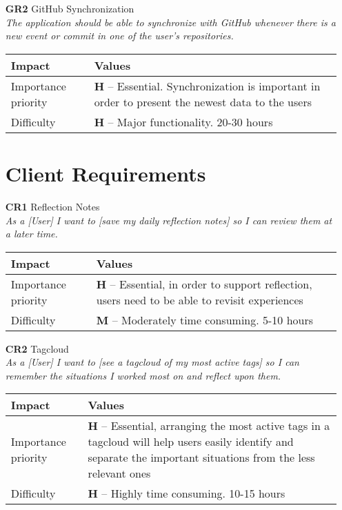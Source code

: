 \begin{itemize}
    \item[\textbf{GR2}] GitHub Synchronization\\
        \textit{\small{The application should be able to synchronize with GitHub whenever there is a new event or commit in one of the user's repositories.}}

        \begin{tabular}{| l | p{7cm} |}
            \hline
            \rowcolor[gray]{0.8}
            \textbf{Impact} & \textbf{Values} \\
            \hline
            Importance priority & \textbf{H} -- Essential. Synchronization is important in order to present the newest data to the users\\
            Difficulty & \textbf{H} -- Major functionality. 20-30 hours\\
            \hline
        \end{tabular}
    \vspace{0.5cm}

    \section{Client Requirements}
    \item[\textbf{CR1}] Reflection Notes\\
        \textit{\small{As a [User] I want to [save my daily reflection notes] so I can review them at a later time.}}

        \begin{tabular}{| l | p{8cm} |}
            \hline
            \rowcolor[gray]{0.8}
            \textbf{Impact} & \textbf{Values} \\
            \hline
            Importance priority & \textbf{H} -- Essential, in order to support reflection, users need to be able to revisit experiences\\
            Difficulty & \textbf{M} -- Moderately time consuming. 5-10 hours\\
            \hline
        \end{tabular}
    \vspace{0.5cm}

    \item[\textbf{CR2}] Tagcloud\\
        \textit{\small{As a [User] I want to [see a tagcloud of my most active tags] so I can remember the situations I worked most on and reflect upon them.}}

        \begin{tabular}{| l | p{8cm} |}
            \hline
            \rowcolor[gray]{0.8}
            \textbf{Impact} & \textbf{Values} \\
            \hline
            Importance priority & \textbf{H} -- Essential, arranging the most active tags in a tagcloud will help users easily identify and separate the important situations from the less relevant ones\\
            Difficulty & \textbf{H} -- Highly time consuming. 10-15 hours\\
            \hline
        \end{tabular}
    \vspace{0.5cm}


\end{itemize}
